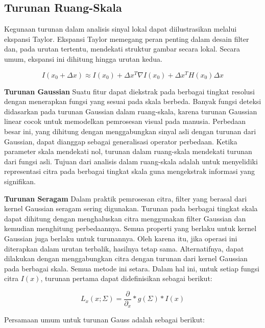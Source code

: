 \subsection{Turunan Ruang-Skala}
\label{subsec:scalespace}

Kegunaan turunan dalam analisis sinyal lokal dapat diilustrasikan melalui ekspansi Taylor. Ekspansi Taylor memegang peran penting dalam desain filter dan, pada urutan tertentu, mendekati struktur gambar secara lokal. Secara umum, ekspansi ini dihitung hingga urutan kedua.

\begin{equation*}
  I(x_{0} +\Delta x) \approx I(x_{0}) + \Delta x^{T}\nabla  I(x_{0}) + \Delta x^{T} H(x_{0}) \Delta x
\end{equation*}

\textbf{Turunan Gaussian} Suatu fitur dapat diekstrak pada berbagai tingkat resolusi dengan menerapkan fungsi yang sesuai pada skala berbeda. Banyak fungsi deteksi didasarkan pada turunan Gaussian dalam ruang-skala, karena turunan Gaussian linear cocok untuk memodelkan pemrosesan visual pada manusia. Perbedaan besar ini, yang dihitung dengan menggabungkan sinyal asli dengan turunan dari Gaussian, dapat dianggap sebagai generalisasi operator perbedaan. Ketika parameter skala mendekati nol, turunan dalam ruang-skala mendekati turunan dari fungsi asli. Tujuan dari analisis dalam ruang-skala adalah untuk menyelidiki representasi citra pada berbagai tingkat skala guna mengekstrak informasi yang signifikan.

\textbf{Turunan Seragam} Dalam praktik pemrosesan citra, filter yang berasal dari kernel Gaussian seragam sering digunakan. Turunan pada berbagai tingkat skala dapat dihitung dengan menghaluskan citra menggunakan filter Gaussian dan kemudian menghitung perbedaannya. Semua properti yang berlaku untuk kernel Gaussian juga berlaku untuk turunannya. Oleh karena itu, jika operasi ini diterapkan dalam urutan terbalik, hasilnya tetap sama. Alternatifnya, dapat dilakukan dengan menggabungkan citra dengan turunan dari kernel Gaussian pada berbagai skala. Semua metode ini setara. Dalam hal ini, untuk setiap fungsi citra \(I(x)\), turunan pertama dapat didefinisikan sebagai berikut:

\begin{equation*}
  L_{x}(x;\Sigma) = \frac{\partial}{\partial_{x}} * g(\Sigma) * I(x)
\end{equation*}

Persamaan umum untuk turunan Gauss adalah sebagai berikut:

